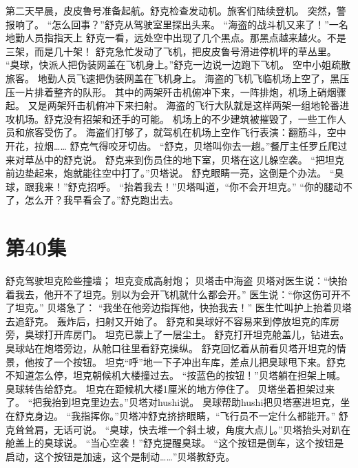 \documentclass[a4paper,12pt,UTF8,twoside]{ctexbook}
\begin{document}
        第二天早晨，皮皮鲁号准备起航。舒克检查发动机。旅客们陆续登机。 
        突然，警报响了。 
        “怎么回事？”舒克从驾驶室里探出头来。 
        “海盗的战斗机又来了！”一名地勤人员指指天上 
        舒克一看，远处空中出现了几个黑点。那黑点越来越火。不是三架，而是几十架！ 
        舒克急忙发动了飞机，把皮皮鲁号滑进停机坪的草丛里。 
        “臭球，快派人把伪装网盖在飞机身上。”舒克一边说一边跑下飞机。 
        空中小姐疏散旅客。 
        地勤人员飞速把伪装网盖在飞机身上。 
        海盗的飞机飞临机场上空了，黑压压一片排着整齐的队形。 
        其中的两架歼击机俯冲下来，一阵排炮，机场上硝烟骤起。 
        又是两架歼击机俯冲下来扫射。 
        海盗的飞行大队就是这样两架一组地轮番进攻机场。舒克没有招架和还手的可能。 
        机场上的不少建筑被摧毁了，一些工作人员和旅客受伤了。 
        海盗们打够了，就驾机在机场上空作飞行表演：翻筋斗，空中开花，拉烟…… 
        舒克气得咬牙切齿。 
        “舒克，贝塔叫你去一趟。”餐厅主任罗丘爬过来对草丛中的舒克说。 
        舒克来到伤员住的地下室，贝塔在这儿躲空袭。 
        “把坦克前边垫起来，炮就能往空中打了。”贝塔说。 
        舒克眼睛一亮，这倒是个办法。 
        “臭球，跟我来！”舒克招呼。 
        “抬着我去！”贝塔叫道，“你不会开坦克。” 
        “你的腿动不了，怎么开？我早看会了。”舒克跑出去。   \chapter{第40集} 
        舒克驾驶坦克险些撞墙； 
        坦克变成高射炮； 
        贝塔击中海盗   
        贝塔对医生说：“快抬着我去，他开不了坦克。别以为会开飞机就什么都会开。” 
        医生说：“你这伤可开不了坦克。” 
        贝塔急了：  “我坐在他旁边指挥他，快抬我去！” 
        医生忙叫护上抬着贝塔去追舒克。 
        轰炸后，扫射又开始了。 
        舒克和臭球好不容易来到停放坦克的库房旁，臭球打开库房门。 
        坦克已蒙上了一层尘土。 
        舒克打开坦克舱盖儿，钻进去。 
        臭球站在炮塔旁边，从舱口往里看舒克操纵。 
        舒克回忆着从前看贝塔开坦克的情景，他按了一个按钮。 
        坦克“呼”地一下子冲出车库，差点儿把臭球甩下来。舒克不知道怎么停，坦克朝候机大楼撞过去。 
        “按蓝色的按钮！”贝塔躺在担架上喊。 
        臭球转告给舒克。 
        坦克在距候机大楼1厘米的地方停住了。 
        贝塔坐着担架过来了。 
        “把我抬到坦克里边去。”贝塔对hushi说。 
        臭球帮助hushi把贝塔塞进坦克，坐在舒克身边。 
        “我指挥你。”贝塔冲舒克挤挤眼睛，“飞行员不一定什么都能开。” 
        舒克耸耸肩，无话可说。 
        “臭球，快去堆一个斜土坡，角度大点儿。”贝塔抬头对趴在舱盖上的臭球说。 
        “当心空袭！”舒克提醒臭球。 
        “这个按钮是倒车，这个按钮是启动，这个按钮是加速，这个是制动……”贝塔教舒克。 
\end{document}
